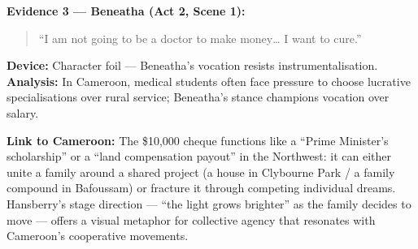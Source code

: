 \documentclass[11pt]{article}
\begin{document}
\begin{exemplebox}
\textbf{Evidence 3 — Beneatha (Act 2, Scene 1):} 
\begin{quote}
“I am not going to be a doctor to make money… I want to cure.”
\end{quote}
\textbf{Device:} Character foil — Beneatha’s vocation resists instrumentalisation. 
\textbf{Analysis:} In Cameroon, medical students often face pressure to choose lucrative specialisations over rural service; Beneatha’s stance champions vocation over salary.

\textbf{Link to Cameroon:} The \$10,000 cheque functions like a “Prime Minister’s scholarship” or a “land compensation payout” in the Northwest: it can either unite a family around a shared project (a house in Clybourne Park / a family compound in Bafoussam) or fracture it through competing individual dreams. Hansberry’s stage direction — “the light grows brighter” as the family decides to move — offers a visual metaphor for collective agency that resonates with Cameroon’s cooperative movements.
\end{exemplebox}
\end{document}
